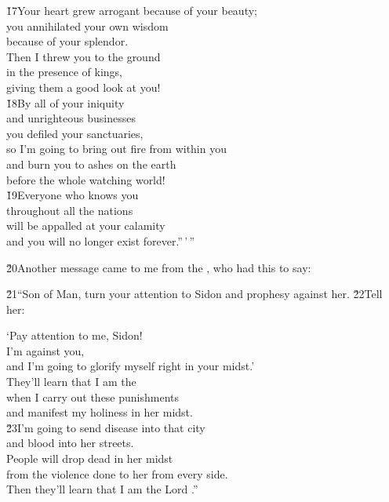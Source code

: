 \begin{poetry}
\poeml \v{17}Your heart grew arrogant because of your beauty; \\
\poemll    you annihilated your own wisdom \\
\poemlll       because of your splendor. \\
\poeml Then I threw you to the ground \\
\poemll    in the presence of kings, \\
\poemlll       giving them a good look at you! \\
\poeml \v{18}By all of your iniquity \\
\poemll    and unrighteous businesses \\
\poeml you defiled your sanctuaries, \\
\poemll    so I'm going to bring out fire from within you \\
\poeml and burn you to ashes on the earth \\
\poemll    before the whole watching world! \\
\poeml \v{19}Everyone who knows you \\
\poemll    throughout all the nations \\
\poeml will be appalled at your calamity \\
\poemll    and you will no longer exist forever.''\,'\,''
\end{poetry}

\v{20}Another message came to me from the , who had this to say:

\v{21}``Son of Man, turn your attention to Sidon and prophesy against her. \v{22}Tell her:

\begin{poetry}
\poeml `Pay attention to me, Sidon! \\
\poemll    I'm against you, \\
\poemlll       and I'm going to glorify myself right in your midst.' \\
\poeml They'll learn that I am the  \\
\poemll    when I carry out these punishments \\
\poemlll       and manifest my holiness in her midst. \\
\poeml \v{23}I'm going to send disease into that city \\
\poemll    and blood into her streets. \\
\poeml People will drop dead in her midst \\
\poemll    from the violence done to her from every side. \\
\poemlll       Then they'll learn that I am the Lord .''
\end{poetry}

